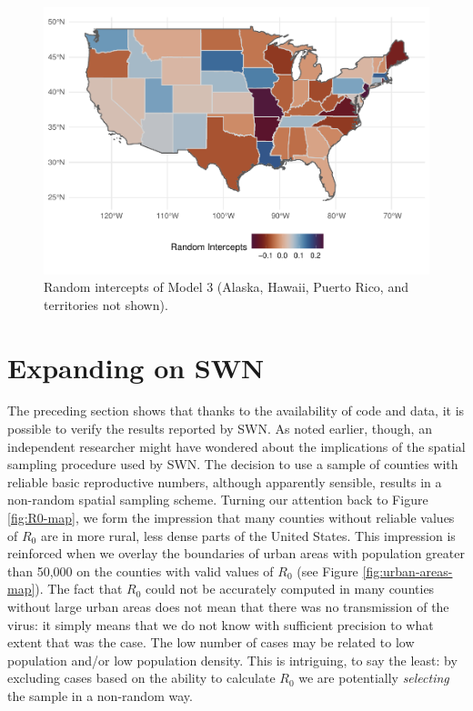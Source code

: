 \documentclass[]{elsarticle} %
\begin{document}
\begin{figure}
\includegraphics[width=1\linewidth]{R0-Density-Reanalysis_files/figure-latex/random-terms-map-1} \caption{\label{fig:random-terms-map}Random intercepts of Model 3 (Alaska, Hawaii, Puerto Rico, and territories not shown).}\label{fig:random-terms-map}
\end{figure}

\hypertarget{expanding-on-swn}{%
\section{Expanding on SWN}\label{expanding-on-swn}}

The preceding section shows that thanks to the availability of code and
data, it is possible to verify the results reported by SWN. As noted
earlier, though, an independent researcher might have wondered about the
implications of the spatial sampling procedure used by SWN. The decision
to use a sample of counties with reliable basic reproductive numbers,
although apparently sensible, results in a non-random spatial sampling
scheme. Turning our attention back to Figure \ref{fig:R0-map}, we form
the impression that many counties without reliable values of \(R_0\) are
in more rural, less dense parts of the United States. This impression is
reinforced when we overlay the boundaries of urban areas with population
greater than 50,000 on the counties with valid values of \(R_0\) (see
Figure \ref{fig:urban-areas-map}). The fact that \(R_0\) could not be
accurately computed in many counties without large urban areas does not
mean that there was no transmission of the virus: it simply means that
we do not know with sufficient precision to what extent that was the
case. The low number of cases may be related to low population and/or
low population density. This is intriguing, to say the least: by
excluding cases based on the ability to calculate \(R_0\) we are
potentially \emph{selecting} the sample in a non-random way.
\end{document}
